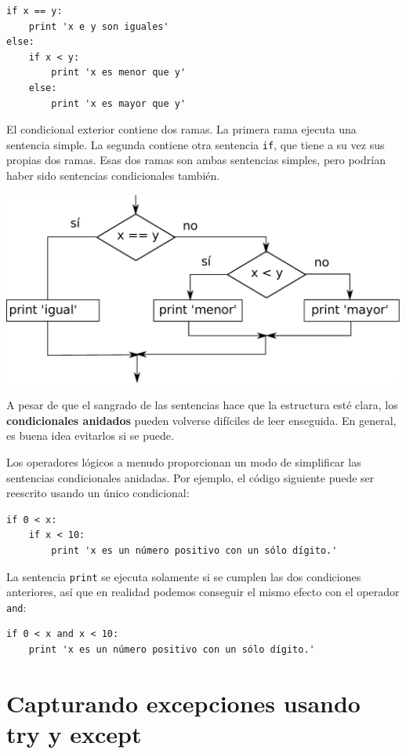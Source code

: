 \beforeverb
\begin{verbatim}
if x == y:
    print 'x e y son iguales'
else:
    if x < y:
        print 'x es menor que y'
    else:
        print 'x es mayor que y'
\end{verbatim}
\afterverb
%
El condicional exterior contiene dos ramas. La
primera rama ejecuta una sentencia simple. La segunda
contiene otra sentencia {\tt if}, que tiene a su vez sus propias
dos ramas. Esas dos ramas son ambas sentencias simples,
pero podrían haber sido sentencias condicionales también.

\beforefig
\centerline{\includegraphics[height=2.50in]{figs2/nested.eps}}
\afterfig

A pesar de que el sangrado de las sentencias hace que la estructura
esté clara, los {\bf condicionales anidados} pueden volverse difíciles
de leer enseguida. En general, es buena idea evitarlos si se puede.

Los operadores lógicos a menudo proporcionan un modo de simplificar las
sentencias condicionales anidadas. Por ejemplo, el código siguiente
puede ser reescrito usando un único condicional:

\beforeverb
\begin{verbatim}
if 0 < x:
    if x < 10:
        print 'x es un número positivo con un sólo dígito.'
\end{verbatim}
\afterverb
%
La sentencia {\tt print} se ejecuta solamente si se cumplen las dos condiciones
anteriores, así que en realidad podemos conseguir el mismo efecto con el operador {\tt and}:

\beforeverb
\begin{verbatim}
if 0 < x and x < 10:
    print 'x es un número positivo con un sólo dígito.'
\end{verbatim}
\afterverb


\section{Capturando excepciones usando try y except}
\label{catch1}


